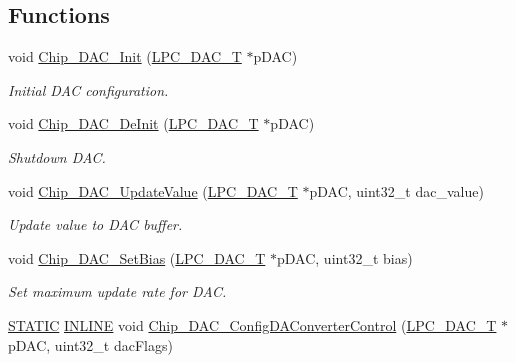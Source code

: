 \subsection*{Functions}
\begin{DoxyCompactItemize}
\item 
void \hyperlink{group___d_a_c__18_x_x__43_x_x_ga677c6f03e4ea92656c4cb3497fbb4a1b}{Chip\+\_\+\+D\+A\+C\+\_\+\+Init} (\hyperlink{struct_l_p_c___d_a_c___t}{L\+P\+C\+\_\+\+D\+A\+C\+\_\+T} $\ast$p\+D\+AC)
\begin{DoxyCompactList}\small\item\em Initial D\+AC configuration. \end{DoxyCompactList}\item 
void \hyperlink{group___d_a_c__18_x_x__43_x_x_gabc7ee03f31b9085f6e77137e7ed1158d}{Chip\+\_\+\+D\+A\+C\+\_\+\+De\+Init} (\hyperlink{struct_l_p_c___d_a_c___t}{L\+P\+C\+\_\+\+D\+A\+C\+\_\+T} $\ast$p\+D\+AC)
\begin{DoxyCompactList}\small\item\em Shutdown D\+AC. \end{DoxyCompactList}\item 
void \hyperlink{group___d_a_c__18_x_x__43_x_x_ga8fa415039ac2f63388ff12cf43cc45bf}{Chip\+\_\+\+D\+A\+C\+\_\+\+Update\+Value} (\hyperlink{struct_l_p_c___d_a_c___t}{L\+P\+C\+\_\+\+D\+A\+C\+\_\+T} $\ast$p\+D\+AC, uint32\+\_\+t dac\+\_\+value)
\begin{DoxyCompactList}\small\item\em Update value to D\+AC buffer. \end{DoxyCompactList}\item 
void \hyperlink{group___d_a_c__18_x_x__43_x_x_ga01352564a69b1286d45a65cf06a246f2}{Chip\+\_\+\+D\+A\+C\+\_\+\+Set\+Bias} (\hyperlink{struct_l_p_c___d_a_c___t}{L\+P\+C\+\_\+\+D\+A\+C\+\_\+T} $\ast$p\+D\+AC, uint32\+\_\+t bias)
\begin{DoxyCompactList}\small\item\em Set maximum update rate for D\+AC. \end{DoxyCompactList}\item 
\hyperlink{group___l_p_c___types___public___macros_ga10b2d890d871e1489bb02b7e70d9bdfb}{S\+T\+A\+T\+IC} \hyperlink{spifi__18xx__43xx_8h_a2eb6f9e0395b47b8d5e3eeae4fe0c116}{I\+N\+L\+I\+NE} void \hyperlink{group___d_a_c__18_x_x__43_x_x_gadd2150c87e3fc28f301417f34a5eb287}{Chip\+\_\+\+D\+A\+C\+\_\+\+Config\+D\+A\+Converter\+Control} (\hyperlink{struct_l_p_c___d_a_c___t}{L\+P\+C\+\_\+\+D\+A\+C\+\_\+T} $\ast$p\+D\+AC, uint32\+\_\+t dac\+Flags)

\end{DoxyCompactItemize}
